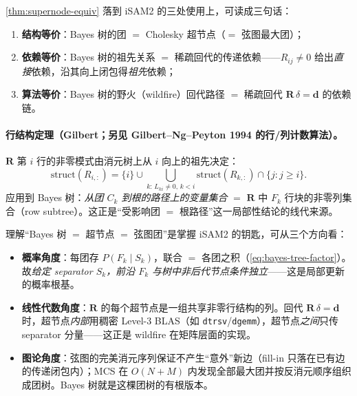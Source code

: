 \cref{thm:supernode-equiv} 落到 iSAM2 的三处使用上，可读成三句话：
\begin{enumerate}
  \item \textbf{结构等价}：Bayes 树的团 $=$ Cholesky 超节点（$=$ 弦图最大团）；
  \item \textbf{依赖等价}：Bayes 树的祖先关系 $=$ 稀疏回代的传递依赖——$R_{ij}\neq 0$ 给出\emph{直接}依赖，沿其向上闭包得\emph{祖先}依赖；
  \item \textbf{算法等价}：Bayes 树的野火（wildfire）回代路径 $=$ 稀疏回代 $\mathbf{R}\,\delta=\mathbf{d}$ 的依赖链。
\end{enumerate}

\paragraph{行结构定理（Gilbert\cite{gilbert1994predicting}；另见 Gilbert--Ng--Peyton 1994 的行/列计数算法）。}
$\mathbf{R}$ 第 $i$ 行的非零模式由消元树上从 $i$ 向上的祖先决定：
\begin{equation}
  \mathrm{struct}(R_{i,:})=\{i\}\cup\bigcup_{k:\,L_{ki}\neq 0,\,k<i}\mathrm{struct}(R_{k,:})\cap\{j:j\ge i\}.
  \label{eq:row-struct}
\end{equation}
应用到 Bayes 树：\emph{从团 $C_k$ 到根的路径上的变量集合} $=$ $\mathbf{R}$ 中 $F_k$ 行块的非零列集合（row subtree）。这正是“受影响团 $=$ 根路径”这一局部性结论的线代来源。

\begin{insight}[等价性的三重解读]
理解“Bayes 树 $=$ 超节点 $=$ 弦图团”是掌握 iSAM2 的钥匙，可从三个方向看：
\begin{itemize}
  \item \textbf{概率角度}：每团存 $P(F_k\mid S_k)$，联合 $=$ 各团之积（\cref{eq:bayes-tree-factor}）。故\emph{给定 separator $S_k$，前沿 $F_k$ 与树中非后代节点条件独立}——这是局部更新的概率根基。
  \item \textbf{线性代数角度}：$\mathbf{R}$ 的每个超节点是一组共享非零行结构的列。回代 $\mathbf{R}\,\delta=\mathbf{d}$ 时，超节点\emph{内部}用稠密 Level-3 BLAS（如 \texttt{dtrsv}/\allowbreak\texttt{dgemm}），超节点\emph{之间}只传 separator 分量——这正是 wildfire 在矩阵层面的实现。
  \item \textbf{图论角度}：弦图的完美消元序列保证不产生“意外”新边（fill-in 只落在已有边的传递闭包内）；MCS 在 $O(N+M)$ 内发现全部最大团并按反消元顺序组织成团树。Bayes 树就是这棵团树的有根版本。
\end{itemize}
\end{insight}

